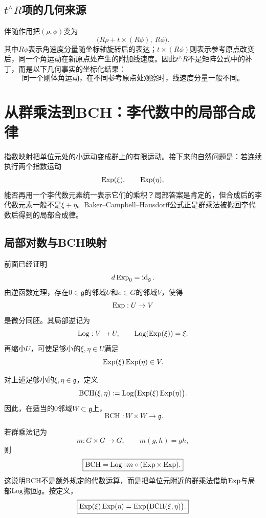 \subsection{$t^\wedge R$项的几何来源}

伴随作用把$(\rho,\phi)$变为
\[
    \bigl(R\rho+t\times(R\phi),\ R\phi\bigr).
\]
其中$R\phi$表示角速度分量随坐标轴旋转后的表达；$t\times(R\phi)$则表示参考原点改变后，同一个角运动在新原点处产生的附加线速度。因此$t^\wedge R$不是矩阵公式中的补丁，而是以下几何事实的坐标化结果：
\[
    \boxed{
    \text{同一个刚体角运动，在不同参考原点处观察时，线速度分量一般不同。}
    }
\]


\section{从群乘法到BCH：李代数中的局部合成律}

指数映射把单位元处的小运动变成群上的有限运动。接下来的自然问题是：若连续执行两个指数运动
\[
    \operatorname{Exp}(\xi),
    \qquad
    \operatorname{Exp}(\eta),
\]
能否再用一个李代数元素统一表示它们的乘积？局部答案是肯定的，但合成后的李代数元素一般不是$\xi+\eta$。Baker--Campbell--Hausdorff公式正是群乘法被搬回李代数后得到的局部合成律。

\subsection{局部对数与BCH映射}

前面已经证明
\[
    d\operatorname{Exp}_0=\operatorname{id}_{\mathfrak g}.
\]
由逆函数定理，存在$0\in\mathfrak g$的邻域$U$和$e\in G$的邻域$V$，使得
\[
    \operatorname{Exp}:U\to V
\]
是微分同胚。其局部逆记为
\[
    \operatorname{Log}:V\to U,
    \qquad
    \operatorname{Log}(\operatorname{Exp}(\xi))=\xi.
\]
再缩小$U$，可使足够小的$\xi,\eta\in U$满足
\[
    \operatorname{Exp}(\xi)\operatorname{Exp}(\eta)\in V.
\]

\begin{definition}[BCH局部合成映射]
对上述足够小的$\xi,\eta\in\mathfrak g$，定义
\[
    \operatorname{BCH}(\xi,\eta)
    :=\operatorname{Log}\bigl(\operatorname{Exp}(\xi)\operatorname{Exp}(\eta)\bigr).
\]
因此，在适当的$0$邻域$W\subset\mathfrak g$上，
\[
    \operatorname{BCH}:W\times W\to\mathfrak g.
\]
\end{definition}

若群乘法记为
\[
    m:G\times G\to G,
    \qquad
    m(g,h)=gh,
\]
则
\[
    \boxed{
    \operatorname{BCH}
    =\operatorname{Log}\circ m\circ(\operatorname{Exp}\times\operatorname{Exp}).
    }
\]
这说明BCH不是额外规定的代数运算，而是把单位元附近的群乘法借助$\operatorname{Exp}$与局部$\operatorname{Log}$搬回$\mathfrak g$。按定义，
\[
    \boxed{
    \operatorname{Exp}(\xi)\operatorname{Exp}(\eta)
    =\operatorname{Exp}\bigl(\operatorname{BCH}(\xi,\eta)\bigr).
    }
\]

